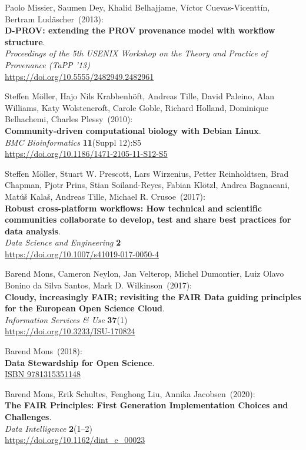 \begin{thebibliography}{9}
Paolo Missier, Saumen Dey, Khalid Belhajjame, Víctor Cuevas-Vicenttín, Bertram Ludäscher~(2013): \\
\textbf{D-PROV: extending the PROV provenance model with workflow structure}.\\
\emph{Proceedings of the 5th USENIX Workshop on the Theory and Practice of Provenance (TaPP '13)}\\
\url{https://doi.org/10.5555/2482949.2482961}

Steffen Möller, Hajo Nils Krabbenhöft, Andreas Tille, David Paleino, Alan Williams, Katy Wolstencroft, Carole Goble, Richard Holland, Dominique Belhachemi, Charles Plessy~(2010): \\
\textbf{Community-driven computational biology with Debian Linux}.\\
\emph{BMC Bioinformatics} \textbf{11}(Suppl 12):S5\\
\url{https://doi.org/10.1186/1471-2105-11-S12-S5}

Steffen Möller, Stuart W. Prescott, Lars Wirzenius, Petter Reinholdtsen, Brad Chapman, Pjotr Prins, Stian Soiland-Reyes, Fabian Klötzl, Andrea Bagnacani, Matúš Kalaš, Andreas Tille, Michael R. Crusoe~(2017): \\
\textbf{Robust cross-platform workflows: How technical and scientific communities collaborate to develop, test and share best practices for data analysis}.\\
\emph{Data Science and Engineering} \textbf{2}\\
\url{https://doi.org/10.1007/s41019-017-0050-4}

Barend Mons, Cameron Neylon, Jan Velterop, Michel Dumontier, Luiz Olavo Bonino da Silva Santos, Mark D. Wilkinson~(2017): \\
\textbf{Cloudy, increasingly FAIR; revisiting the FAIR Data guiding principles for the European Open Science Cloud}.\\
\emph{Information Services \& Use} \textbf{37}(1)\\
\url{https://doi.org/10.3233/ISU-170824}

Barend Mons~(2018): \\
\textbf{Data Stewardship for Open Science}.\\
\href{https://identifiers.org/isbn/9781315351148}{ISBN 9781315351148}

Barend Mons, Erik Schultes, Fenghong Liu, Annika Jacobsen~(2020): \\
\textbf{The FAIR Principles: First Generation Implementation Choices and Challenges}.\\
\emph{Data Intelligence} \textbf{2}(1--2) \\
\url{https://doi.org/10.1162/dint_e_00023}


\end{thebibliography}
